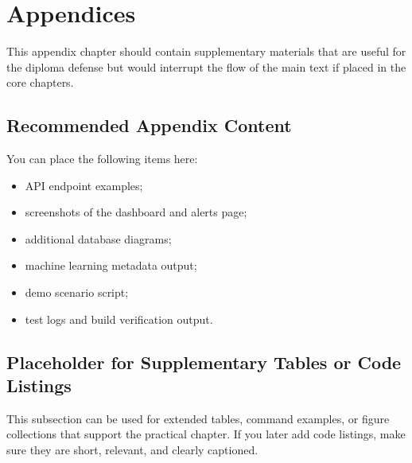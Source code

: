 \chapter{Appendices}

This appendix chapter should contain supplementary materials that are useful for the diploma defense but would interrupt the flow of the main text if placed in the core chapters.

\section{Recommended Appendix Content}

You can place the following items here:
\begin{itemize}
    \item API endpoint examples;
    \item screenshots of the dashboard and alerts page;
    \item additional database diagrams;
    \item machine learning metadata output;
    \item demo scenario script;
    \item test logs and build verification output.
\end{itemize}

\section{Placeholder for Supplementary Tables or Code Listings}

This subsection can be used for extended tables, command examples, or figure collections that support the practical chapter. If you later add code listings, make sure they are short, relevant, and clearly captioned.

